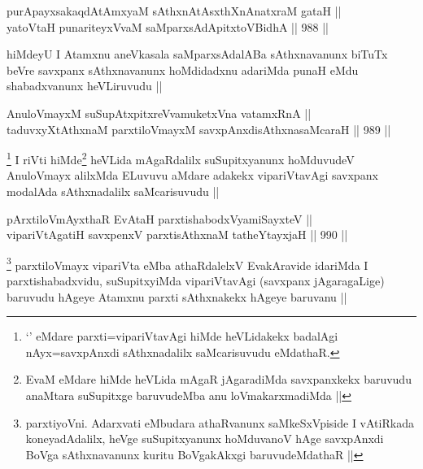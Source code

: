 
\begin{shl}
purA\s payxsakaqdAtAmx\s yaM sAthxnAtAsxthXnAnatxraM gataH || \\
yatoV\s taH punariteyxVvaM saMparxsAdApitxtoV\s BidhA ||  988 ||  
\end{shl}

\begin{artha}
hiMdeyU I Atamxnu aneVkasala saMparxsAdalABa sAthxnavanunx biTuTx beVre savxpanx sAthxnavanunx hoMdidadxnu adariMda punaH eMdu shabadxvanunx heVLiruvudu ||
\end{artha}

\begin{shl}
AnuloVmayxM suSupAtxpitxreVvamuketxVna vatamxRnA || \\
taduvxyXtAthxnaM parxtiloVmayxM savxpAnxdisAthxnasaMcaraH ||   989 ||  
\end{shl}

\begin{artha}
\footnote{`\stext' eMdare parxti=vipariVtavAgi hiMde heVLidakekx badalAgi nAyx=savxpAnxdi sAthxnadalilx saMcarisuvudu eMdathaR.}
I riVti hiMde\footnote{EvaM eMdare hiMde heVLida mAgaR jAgaradiMda savxpanxkekx baruvudu anaMtara suSupitxge baruvudeMba anu loVmakarxmadiMda ||} heVLida mAgaRdalilx suSupitxyanunx hoMduvudeV AnuloVmayx alilxMda ELuvuvu aMdare adakekx vipariVtavAgi savxpanx modalAda sAthxnadalilx saMcarisuvudu ||
\end{artha}


\begin{shl}
pArxtiloVmAyxthaR EvAtaH parxtishabodxV\s yamiSayxteV ||  \\
vipariVtA\s \s gatiH savxpenxV parxtisAthxnaM tatheYtayxjaH ||  990 ||  
\end{shl}

\begin{artha}
\footnote{parxtiyoVni. Adarxvati eMbudara athaRvanunx saMkeSxVpiside I vAtiRkada koneyadAdalilx, heVge suSupitxyanunx hoMduvanoV hAge savxpAnxdi BoVga sAthxnavanunx kuritu BoVgakAkxgi baruvudeMdathaR ||}
parxtiloVmayx vipariVta eMba athaRdalelxV EvakAravide idariMda I parxtishabadxvidu, suSupitxyiMda vipariVtavAgi (savxpanx jAgaragaLige) baruvudu hAgeye Atamxnu parxti sAthxnakekx hAgeye baruvanu ||
\end{artha}


